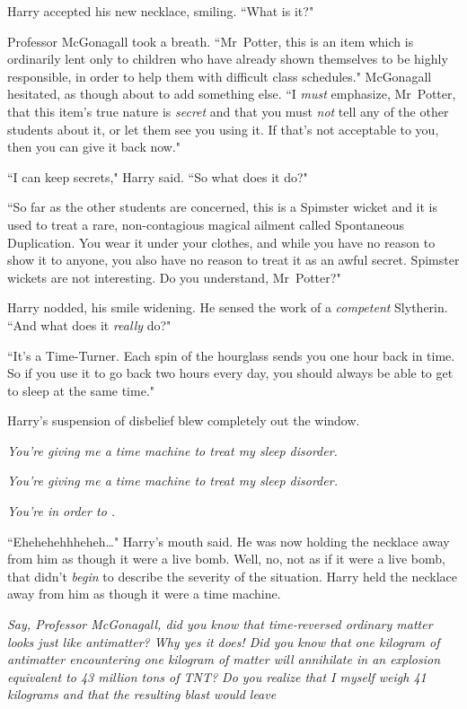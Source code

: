 Harry accepted his new necklace, smiling. ``What is it?"

Professor McGonagall took a breath. ``Mr~Potter, this is an item which is ordinarily lent only to children who have already shown themselves to be highly responsible, in order to help them with difficult class schedules." McGonagall hesitated, as though about to add something else. ``I \emph{must} emphasize, Mr~Potter, that this item's true nature is \emph{secret} and that you must \emph{not} tell any of the other students about it, or let them see you using it. If that's not acceptable to you, then you can give it back now."

``I can keep secrets," Harry said. ``So what does it do?"

``So far as the other students are concerned, this is a Spimster wicket and it is used to treat a rare, non-contagious magical ailment called Spontaneous Duplication. You wear it under your clothes, and while you have no reason to show it to anyone, you also have no reason to treat it as an awful secret. Spimster wickets are not interesting. Do you understand, Mr~Potter?"

Harry nodded, his smile widening. He sensed the work of a \emph{competent} Slytherin. ``And what does it \emph{really} do?"

``It's a Time-Turner. Each spin of the hourglass sends you one hour back in time. So if you use it to go back two hours every day, you should always be able to get to sleep at the same time."

Harry's suspension of disbelief blew completely out the window.

\emph{You're giving me a time machine to treat my sleep disorder.}

\emph{You're giving me a \emph{time machine} to treat my \emph{sleep disorder}.}

\emph{You're  in order to .}

``Ehehehehhheheh{\ldots}" Harry's mouth said. He was now holding the necklace away from him as though it were a live bomb. Well, no, not as if it were a live bomb, that didn't \emph{begin} to describe the severity of the situation. Harry held the necklace away from him as though it were a time machine.

\emph{Say, Professor McGonagall, did you know that time-reversed ordinary matter looks just like antimatter? Why yes it does! Did you know that one kilogram of antimatter encountering one kilogram of matter will annihilate in an explosion equivalent to 43 million tons of TNT? Do you realize that I myself weigh 41 kilograms and that the resulting blast would leave }

